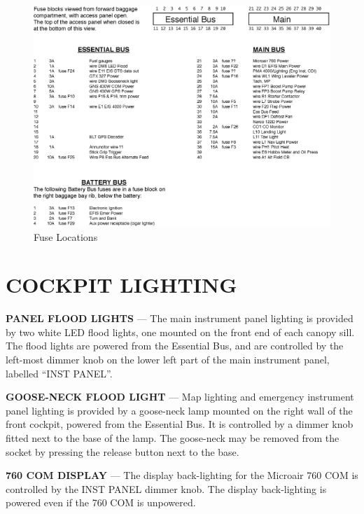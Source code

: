 \begin{figure}
\centering 
\includegraphics[scale=0.8]{../Diagrams/Fuse_Blocks_POH} \caption{Fuse Locations}


\end{figure}

\FloatBarrier

\section{COCKPIT LIGHTING}

\textbf{PANEL FLOOD LIGHTS} --- The main instrument panel lighting is provided by two white LED flood lights, one mounted on the front end of each canopy sill. The flood lights are powered from the Essential Bus, and are controlled by the left-most dimmer knob on the lower left part of the main instrument panel, labelled ``INST PANEL''.

\textbf{GOOSE-NECK FLOOD LIGHT} --- Map lighting and emergency instrument panel lighting is provided by a goose-neck lamp mounted on the right wall of the front cockpit, powered from the Essential Bus. It is controlled by a dimmer knob fitted next to the base of the lamp. The goose-neck may be removed from the socket by pressing the release button next to the base.

\textbf{760 COM DISPLAY} --- The display back-lighting for the Microair 760 COM is controlled by the INST PANEL dimmer knob. The display back-lighting is powered even if the 760 COM is unpowered.

